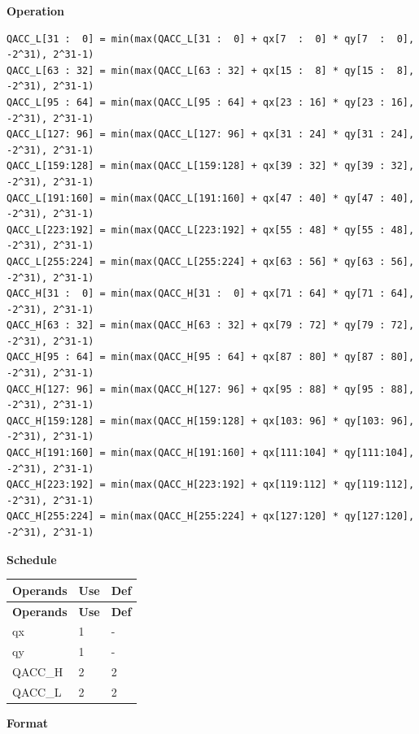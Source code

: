 \textbf{Operation}\\
\begin{lstlisting}
QACC_L[31 :  0] = min(max(QACC_L[31 :  0] + qx[7  :  0] * qy[7  :  0], -2^31), 2^31-1)
QACC_L[63 : 32] = min(max(QACC_L[63 : 32] + qx[15 :  8] * qy[15 :  8], -2^31), 2^31-1)
QACC_L[95 : 64] = min(max(QACC_L[95 : 64] + qx[23 : 16] * qy[23 : 16], -2^31), 2^31-1)
QACC_L[127: 96] = min(max(QACC_L[127: 96] + qx[31 : 24] * qy[31 : 24], -2^31), 2^31-1)
QACC_L[159:128] = min(max(QACC_L[159:128] + qx[39 : 32] * qy[39 : 32], -2^31), 2^31-1)
QACC_L[191:160] = min(max(QACC_L[191:160] + qx[47 : 40] * qy[47 : 40], -2^31), 2^31-1)
QACC_L[223:192] = min(max(QACC_L[223:192] + qx[55 : 48] * qy[55 : 48], -2^31), 2^31-1)
QACC_L[255:224] = min(max(QACC_L[255:224] + qx[63 : 56] * qy[63 : 56], -2^31), 2^31-1)
QACC_H[31 :  0] = min(max(QACC_H[31 :  0] + qx[71 : 64] * qy[71 : 64], -2^31), 2^31-1)
QACC_H[63 : 32] = min(max(QACC_H[63 : 32] + qx[79 : 72] * qy[79 : 72], -2^31), 2^31-1)
QACC_H[95 : 64] = min(max(QACC_H[95 : 64] + qx[87 : 80] * qy[87 : 80], -2^31), 2^31-1)
QACC_H[127: 96] = min(max(QACC_H[127: 96] + qx[95 : 88] * qy[95 : 88], -2^31), 2^31-1)
QACC_H[159:128] = min(max(QACC_H[159:128] + qx[103: 96] * qy[103: 96], -2^31), 2^31-1)
QACC_H[191:160] = min(max(QACC_H[191:160] + qx[111:104] * qy[111:104], -2^31), 2^31-1)
QACC_H[223:192] = min(max(QACC_H[223:192] + qx[119:112] * qy[119:112], -2^31), 2^31-1)
QACC_H[255:224] = min(max(QACC_H[255:224] + qx[127:120] * qy[127:120], -2^31), 2^31-1)

\end{lstlisting}

\textbf{Schedule}\\
\begin{longtable}[c]{|l|l|l|}
    \hline
    \rowcolor{lightgray}
    \textbf{Operands} & \textbf{Use} & \textbf{Def} \\\hline
    \endfirsthead
    \hline
    \rowcolor{lightgray}
     \textbf{Operands} & \textbf{Use} & \textbf{Def} \\\hline
    \endhead
    \hline
    \endfoot

     qx & 1 & - \\\hline
     qy & 1 & - \\\hline
     QACC\_H & 2 & 2 \\\hline
     QACC\_L & 2 & 2

\end{longtable}

\textbf{Format}\\

